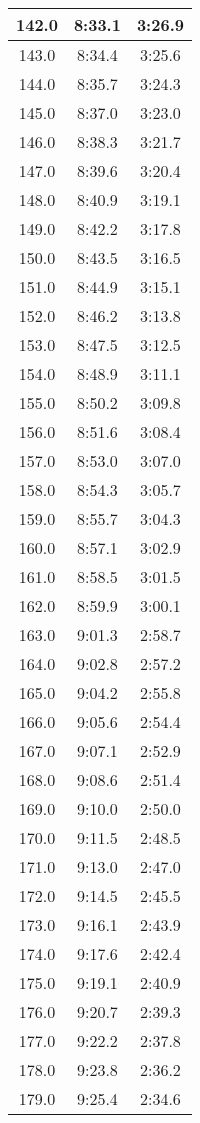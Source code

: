 \begin{footnotesize}
\begin{minipage}{0.25\textwidth}
\begin{tabular}[t]{c|c|c}
	142.0&8:33.1&3:26.9\\\hline
	143.0&8:34.4&3:25.6\\\hline
	144.0&8:35.7&3:24.3\\\hline
	145.0&8:37.0&3:23.0\\\hline
	146.0&8:38.3&3:21.7\\\hline
	147.0&8:39.6&3:20.4\\\hline
	148.0&8:40.9&3:19.1\\\hline
	149.0&8:42.2&3:17.8\\\hline
	150.0&8:43.5&3:16.5\\\hline
	151.0&8:44.9&3:15.1\\\hline
	152.0&8:46.2&3:13.8\\\hline
	153.0&8:47.5&3:12.5\\\hline
	154.0&8:48.9&3:11.1\\\hline
	155.0&8:50.2&3:09.8\\\hline
	156.0&8:51.6&3:08.4\\\hline
	157.0&8:53.0&3:07.0\\\hline
	158.0&8:54.3&3:05.7\\\hline
	159.0&8:55.7&3:04.3\\\hline
	160.0&8:57.1&3:02.9\\\hline
	161.0&8:58.5&3:01.5\\\hline
	162.0&8:59.9&3:00.1\\\hline
	163.0&9:01.3&2:58.7\\\hline
	164.0&9:02.8&2:57.2\\\hline
	165.0&9:04.2&2:55.8\\\hline
	166.0&9:05.6&2:54.4\\\hline
	167.0&9:07.1&2:52.9\\\hline
	168.0&9:08.6&2:51.4\\\hline
	169.0&9:10.0&2:50.0\\\hline
	170.0&9:11.5&2:48.5\\\hline
	171.0&9:13.0&2:47.0\\\hline
	172.0&9:14.5&2:45.5\\\hline
	173.0&9:16.1&2:43.9\\\hline
	174.0&9:17.6&2:42.4\\\hline
	175.0&9:19.1&2:40.9\\\hline
	176.0&9:20.7&2:39.3\\\hline
	177.0&9:22.2&2:37.8\\\hline
	178.0&9:23.8&2:36.2\\\hline
	179.0&9:25.4&2:34.6\\\hline

\end{tabular}
\end{minipage}
\end{footnotesize}
